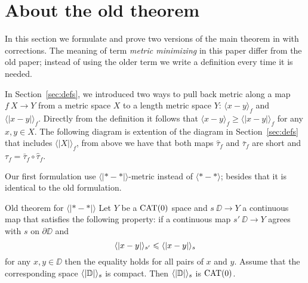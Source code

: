 \section{About the old theorem}\label{sec:old-thm}

In this section we formulate and prove two versions of the main theorem in \cite{petrunin-metric-min} with corrections.
The meaning of term \emph{metric minimizing} in this paper differ from the old paper;
instead of using the older term we write a definition every time it is needed.

In Section~\ref{sec:defs}, we introduced two ways to pull back metric along a map $f\:X\to Y$ from a metric space $X$ to a length metric space $Y$:
$\langle x-y\rangle_f$ and $\langle| x-y|\rangle_f$.
Directly from the definition it follows that  $\langle x-y\rangle_f\ge \langle| x-y|\rangle_f$ for any $x,y\in X$.
The following diagram is extention of the diagram in Section~\ref{sec:defs} that includes $\langle|X|\rangle_f$, from above we have that both maps $\hat\tau_f$ and $\bar\tau_f$ are short and $\tau_f=\bar\tau_f\circ\hat\tau_f$.

\begin{figure}
\centering
{}
\end{figure}

Our first formulation use $\langle|{*}-{*}|\rangle$-metric instead of $\langle{*}-{*}\rangle$; besides that it is identical to the old formulation.

\begin{thm}{Old theorem for $\bm{\langle|{*}-{*}|\rangle}$}\label{thm:old1}
Let $Y$ be a $\mathop{\rm CAT}\nolimits(0)$ space and $s\:\DD\to Y$ a continuous map that satisfies the following property: 
if a continuous map $s'\:\DD\to Y$ agrees with $s$ on $\partial\DD$ and
\[\langle|x-y|\rangle_{s'}\leqslant \langle|x-y|\rangle_{s}\]
for any $x,y\in \DD$
then the equality holds for all pairs of $x$ and $y$.
Assume that the corresponding space $\langle|\mathbb{D}|\rangle_s$ is compact.
Then $\langle|\mathbb{D}|\rangle_s$ is $\mathop{\rm CAT}\nolimits(0)$.
\end{thm}

